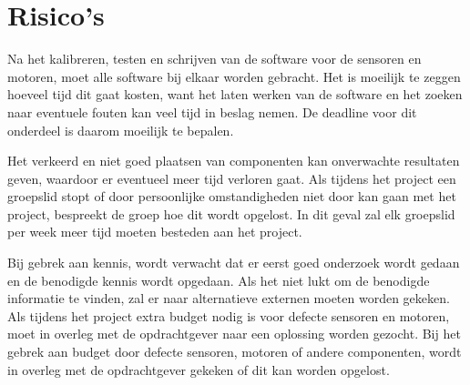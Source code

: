 \section{Risico’s}
Na het kalibreren, testen en schrijven van de software voor de sensoren en motoren, moet alle software bij elkaar worden gebracht. Het is moeilijk te zeggen hoeveel tijd dit gaat kosten, want het laten werken van de software en het zoeken naar eventuele fouten kan veel tijd in beslag nemen. De deadline voor dit onderdeel is daarom moeilijk te bepalen.

Het verkeerd en niet goed plaatsen van componenten kan onverwachte resultaten geven, waardoor er eventueel meer tijd verloren gaat.
Als tijdens het project een groepslid stopt of door persoonlijke omstandigheden niet door kan gaan met het project, bespreekt de groep hoe dit wordt opgelost. In dit geval zal elk groepslid per week meer tijd moeten besteden aan het project.

Bij gebrek aan kennis, wordt verwacht dat er eerst goed onderzoek wordt gedaan en de benodigde kennis wordt opgedaan. Als het niet lukt om de benodigde informatie te vinden, zal er naar alternatieve externen moeten worden gekeken.
Als tijdens het project extra budget nodig is voor defecte sensoren en motoren, moet in overleg met de opdrachtgever naar een oplossing worden gezocht. Bij het gebrek aan budget door defecte sensoren, motoren of andere componenten, wordt in overleg met de opdrachtgever gekeken of dit kan worden opgelost.
